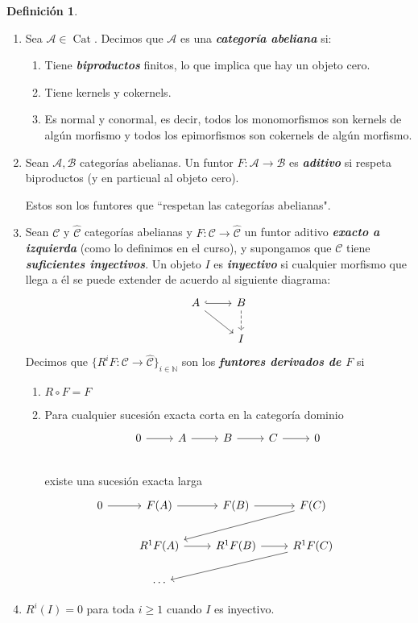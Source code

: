 \documentclass[spanish]{book}
\theoremstyle{definition}
\newtheorem*{defn}{Definición}
\newcommand{\N}{\mathbb{N}}
\begin{document}
\begin{defn}\leavevmode
	\begin{enumerate}
		\item Sea $\mathcal{A}\in\operatorname{Cat}$. Decimos que $\mathcal{A}$ es una \textbf{\textit{categoría abeliana}} si:
	\begin{enumerate}
		\item Tiene \textbf{\textit{biproductos}} finitos, lo que implica que hay un objeto cero.
		\item Tiene kernels y cokernels.
		\item Es normal y conormal, es decir, todos los monomorfismos son kernels de algún morfismo y todos los epimorfismos son cokernels de algún morfismo.
	\end{enumerate}

	\item Sean $\mathcal{A},\mathcal{B}$ categorías abelianas. Un funtor $F:\mathcal{A}\to\mathcal{B}$ es \textbf{\textit{aditivo}} si respeta biproductos (y en particual al objeto cero).
	
	Estos son los funtores que ``respetan las categorías abelianas".
	
	\item Sean $\mathcal{C}$ y $\hat{\mathcal{C}}$ categorías abelianas y $F:\mathcal{C}\to\hat{\mathcal{C}}$ un funtor aditivo \textbf{\textit{exacto a izquierda}} (como lo definimos en el curso), y supongamos que $\mathcal{C}$ tiene \textbf{\textit{suficientes inyectivos}}. Un objeto $I$ es \textbf{\textit{inyectivo}} si cualquier morfismo que llega a él se puede extender de acuerdo al siguiente diagrama:
	\[\begin{tikzcd}
		A\arrow[r,hook]\arrow[dr]&B\arrow[d,dashed]\\
		&I
	\end{tikzcd}\]
	Decimos que $\{R^i F:\mathcal{C}\to\hat{\mathcal{C}}\}_{i\in\N}$ son los \textbf{\textit{funtores derivados de $F$}} si
	\begin{enumerate}
		\item $R\circ F=F$
		\item Para cualquier sucesión exacta corta en la categoría dominio
		\[\begin{tikzcd}
			0\arrow[r]&A\arrow[r]&B\arrow[r]&C\arrow[r]&0\\
		\end{tikzcd}\]
		existe una sucesión exacta larga
		\[\begin{tikzcd}
			0\arrow[r]&F(A)\arrow[r]&F(B)\arrow[r]&F(C)\arrow[dll]\\
			&R^1F(A)\arrow[r]&R^1F(B)\arrow[r]&R^1F(C)\arrow[dll]&\\&\cdots
		\end{tikzcd}\]
	\end{enumerate}
	\item $R^i(I)=0$ para toda $i\geq1$ cuando $I$ es inyectivo.
	\end{enumerate}
\end{defn}
\end{document}
